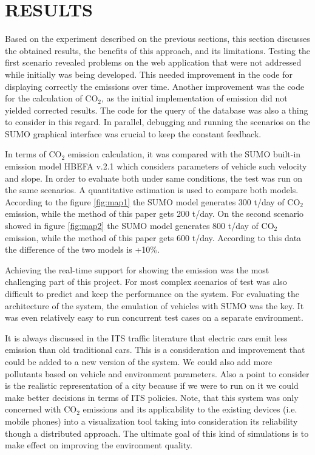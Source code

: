 \documentclass[letter, 10pt, conference]{ieeeconf}
\begin{document}
\section{RESULTS}

Based on the experiment described on the previous sections, this section discusses the obtained results, the benefits of this approach, and its limitations.
Testing the first scenario revealed problems on the web application that were not addressed while initially was being developed.
This needed improvement in the code for displaying correctly the emissions over time.
Another improvement was the code for the calculation of CO$_2$, as the initial implementation of emission did not yielded corrected results.
The code for the query of the database was also a thing to consider in this regard.
In parallel, debugging and running the scenarios on the SUMO graphical interface was crucial to keep the constant feedback.

In terms of CO$_2$ emission calculation, it was compared with the SUMO built-in emission model HBEFA v.2.1 \cite{behrisch_second_2015} which considers parameters of vehicle such velocity and slope.
In order to evaluate both under same conditions, the test was run on the same scenarios.
A quantitative estimation is used to compare both models.
According to the figure \ref{fig:map1} the SUMO model generates 300 t/day of CO$_2$ emission, while the method of this paper gets 200 t/day.
On the second scenario showed in figure \ref{fig:map2} the SUMO model generates 800 t/day of CO$_2$ emission, while the method of this paper gets 600 t/day.
According to this data the difference of the two models is +10\%.

Achieving the real-time support for showing the emission was the most challenging part of this project.
For most complex scenarios of test was also difficult to predict and keep the performance on the system.
For evaluating the architecture of the system, the emulation of vehicles with SUMO was the key.
It was even relatively easy to run concurrent test cases on a separate environment.

It is always discussed in the ITS traffic literature that electric cars emit less emission than old traditional cars.
This is a consideration and improvement that could be added to a new version of the system.
We could also add more pollutants based on vehicle and environment parameters.
Also a point to consider is the realistic representation of a city because if we were to run on it we could make better decisions in terms of ITS policies.
Note, that this system was only concerned with CO$_2$ emissions and its applicability to the existing devices (i.e. mobile phones) into a visualization tool taking into consideration its reliability though a distributed approach.
The ultimate goal of this kind of simulations is to make effect on improving the environment quality.
\end{document}
